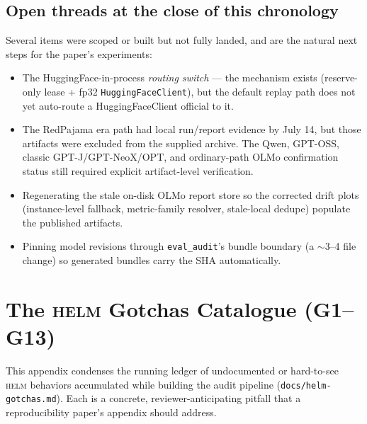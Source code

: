 \documentclass[11pt]{report}
\newcommand{\code}[1]{\texttt{#1}}
\newcommand{\file}[1]{\texttt{#1}}
\begin{document}
\section{Open threads at the close of this chronology}

Several items were scoped or built but not fully landed, and are the natural
next steps for the paper's experiments:

\begin{itemize}[nosep]
  \item The HuggingFace-in-process \emph{routing switch} --- the mechanism exists
        (reserve-only lease + fp32 \code{HuggingFaceClient}), but the default replay
        path does not yet auto-route a HuggingFaceClient official to it.
  \item The RedPajama era path had local run/report evidence by July 14, but
        those  artifacts were excluded from the supplied archive. The
        Qwen, GPT-OSS, classic GPT-J/GPT-NeoX/OPT, and ordinary-path OLMo
        confirmation status still required explicit artifact-level verification.
  \item Regenerating the stale on-disk OLMo report store so the corrected drift
        plots (instance-level fallback, metric-family resolver, stale-local dedupe)
        populate the published artifacts.
  \item Pinning model revisions through \code{eval\_audit}'s bundle boundary (a
        $\sim$3--4 file change) so generated bundles carry the SHA automatically.
\end{itemize}

\appendix
\chapter{The \textsc{helm} Gotchas Catalogue (G1--G13)}
\label{app:gotchas}

This appendix condenses the running ledger of undocumented or hard-to-see
\textsc{helm} behaviors accumulated while building the audit pipeline
(\file{docs/helm-gotchas.md}). Each is a concrete, reviewer-anticipating pitfall
that a reproducibility paper's appendix should address.
\end{document}
